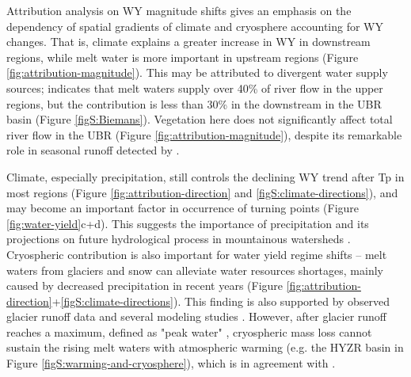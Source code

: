 \documentclass[hess, manuscript]{copernicus}
\begin{document}
Attribution analysis on WY magnitude shifts gives an emphasis on the dependency of spatial gradients of climate and cryosphere accounting for WY changes. That is, climate explains a greater increase in WY in downstream regions, while melt water is more important in upstream regions (Figure \ref{fig:attribution-magnitude}). 
This may be attributed to divergent water supply sources; \citet{biemans2019importance} indicates that melt waters supply over 40\% of river flow in the upper regions, but the contribution is less than 30\% in the downstream in the UBR basin (Figure \ref{figS:Biemans}). Vegetation here does not significantly affect total river flow in the UBR (Figure \ref{fig:attribution-magnitude}), despite its remarkable role in seasonal runoff detected by \citet{li2021vegetation}. 

Climate, especially precipitation, still controls the declining WY trend after Tp in most regions (Figure \ref{fig:attribution-direction} and \ref{figS:climate-directions}), and may become an important factor in occurrence of turning points (Figure \ref{fig:water-yield}c+d). This suggests the importance of precipitation and its projections on future hydrological process in mountainous watersheds \citep{lutz2014consistent}. Cryospheric contribution is also important for water yield regime shifts -- melt waters from glaciers and snow can alleviate water resources shortages, mainly caused by decreased precipitation in recent years (Figure \ref{fig:attribution-direction}+\ref{figS:climate-directions}). This finding is also supported by observed glacier runoff data \citep{yao2010glacial} and several modeling studies \citep{lutz2014consistent, Zhang2020VariationOM, wang2021tp}. However, after glacier runoff reaches a maximum, defined as "peak water" \citep{gleick2010peak}, cryospheric mass loss cannot sustain the rising melt waters with atmospheric warming (e.g. the HYZR basin in Figure \ref{figS:warming-and-cryosphere}), which is in agreement with \citet{huss2018global}. 
\end{document}
